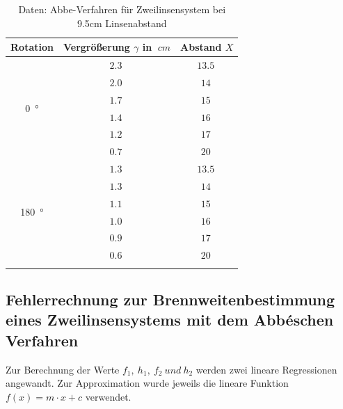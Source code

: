 \begin{table}[h!]
    \begin{center}
        \caption{Daten: Abbe-Verfahren für Zweilinsensystem bei 9.5cm Linsenabstand}
        \begin{tabular}{ccc}
            \hline
            Rotation   &  Vergrößerung  $\gamma$ in $\SI{}{cm}$    & Abstand $X$ \\
            \hline
            \multirow{6}{*}{\SI{0}{\degree}}    & $\SI{2.3}{}$ & $\SI{13.5}{}$ \\
                                                & $\SI{2.0}{}$ & $\SI{14}{}$ \\
                                                & $\SI{1.7}{}$ & $\SI{15}{}$ \\
                                                & $\SI{1.4}{}$ & $\SI{16}{}$ \\
                                                & $\SI{1.2}{}$ & $\SI{17}{}$ \\
                                                & $\SI{0.7}{}$ & $\SI{20}{}$ \\
            \hline
            \multirow{6}{*}{\SI{180}{\degree}}  & $\SI{1.3}{}$ & $\SI{13.5}{}$ \\
                                                & $\SI{1.3}{}$ & $\SI{14}{}$ \\
                                                & $\SI{1.1}{}$ & $\SI{15}{}$ \\
                                                & $\SI{1.0}{}$ & $\SI{16}{}$ \\
                                                & $\SI{0.9}{}$ & $\SI{17}{}$ \\
                                                & $\SI{0.6}{}$ & $\SI{20}{}$ \\
            \hline
            \label{tab:Abbe2}
        \end{tabular}
    \end{center}
\end{table}

\clearpage

\subsection{Fehlerrechnung zur Brennweitenbestimmung eines Zweilinsensystems mit dem Abbéschen Verfahren}

Zur Berechnung der Werte $f_1,\ h_1,\ f_2\ und\ h_2$ werden zwei lineare Regressionen angewandt.
Zur Approximation wurde jeweils die lineare Funktion $f(x) = m \cdot x + c$ verwendet.\\

